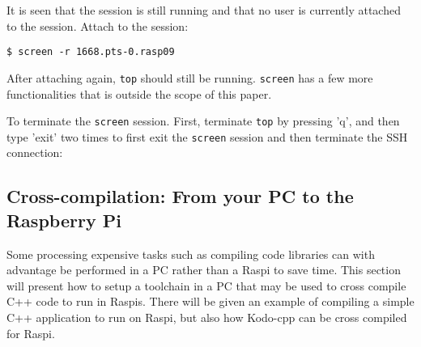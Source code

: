 It is seen that the session is still running and that no user is currently
attached to the session. Attach to the session:
\begin{lstlisting}[]
$ screen -r 1668.pts-0.rasp09
\end{lstlisting}
\FloatBarrier
\vspace{-5mm}

After attaching again, \texttt{top} should still be running. \texttt{screen}
has a few more functionalities that is outside the scope of this
paper.

To terminate the \texttt{screen} session. First, terminate \texttt{top}
by pressing 'q', and then type 'exit' two times to first exit the
\texttt{screen} session and then terminate the \ac{SSH} connection:





\subsection{Cross-compilation: From your PC to the Raspberry Pi}
Some processing expensive tasks such as compiling code libraries can with
advantage be performed in a \ac{PC} rather than a \ac{Raspi} to save time.
This section will present how to setup a toolchain in a \ac{PC} that may
be used to cross compile C++ code to run in \ac{Raspi}s.
There will be given an example of compiling a simple C++ application to run
on \ac{Raspi}, but also how Kodo-cpp can be cross compiled for \ac{Raspi}.

%
%

